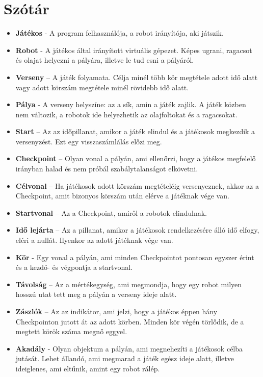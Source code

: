 \section{Szótár}
\begin{itemize}
\item \textbf{Játékos} - A program felhasználója, a robot irányítója, aki játszik.
\item \textbf{Robot} - A játékos által irányított virtuális gépezet. Képes ugrani, ragacsot és olajat helyezni a pályára, illetve le tud esni a pályáról.
\item \textbf{Verseny} – A játék folyamata. Célja minél több kör megtétele adott idő alatt vagy adott körszám megtétele minél rövidebb idő alatt.
\item \textbf{Pálya} - A verseny helyszíne: az a sík, amin a játék zajlik. A játék közben nem változik, a robotok ide helyezhetik az olajfoltokat és a ragacsokat.
\item \textbf{Start} – Az az időpillanat, amikor a játék elindul és a játékosok megkezdik a versenyzést. Ezt egy visszaszámlálás előzi meg.
\item \textbf{Checkpoint} – Olyan vonal a pályán, ami ellenőrzi, hogy a játékos megfelelő irányban halad és nem próbál szabálytalanságot elkövetni.
\item \textbf{Célvonal} – Ha játékosok adott körszám megtételéig versenyeznek, akkor az a Checkpoint, amit bizonyos körszám után elérve a játéknak vége van.
\item \textbf{Startvonal} – Az a Checkpoint, amiről a robotok elindulnak.
\item \textbf{Idő lejárta} – Az a pillanat, amikor a játékosok rendelkezésére álló idő elfogy, eléri a nullát. Ilyenkor az adott játéknak vége van.
\item \textbf{Kör} - Egy vonal a pályán, ami minden Checkpointot pontosan egyszer érint és a kezdő- és végpontja a startvonal.
\item \textbf{Távolság} – Az a mértékegység, ami megmondja, hogy egy robot milyen hosszú utat tett meg a pályán a verseny ideje alatt.
\item \textbf{Zászlók} – Az az indikátor, ami jelzi, hogy a játékos éppen hány Checkpointon jutott át az adott körben. Minden kör végén törlődik, de a megtett körök száma megnő eggyel.
\item \textbf{Akadály} - Olyan objektum a pályán, ami megnehezíti a játékosok célba jutását. Lehet állandó, ami megmarad a játék egész ideje alatt, illetve ideiglenes, ami eltűnik, amint egy robot rálép.

\end{itemize}
